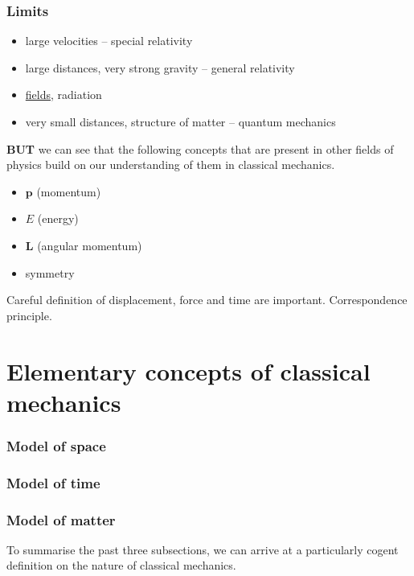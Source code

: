\documentclass{article}
\numberwithin{theorem}{section}
\numberwithin{corollary}{section}
\numberwithin{postulate}{section}
\numberwithin{lemma}{section}
\theoremstyle{definition}
\numberwithin{definition}{section}
\theoremstyle{remark}
\renewcommand{\vec}[1]{\mathbf{#1}}
\begin{document}
\subsubsection{Limits}

\begin{itemize}
  \item large velocities -- special relativity
  \item large distances, very strong gravity -- general relativity
  \item \underline{fields}, radiation
  \item very small distances, structure of matter -- quantum mechanics
\end{itemize}

\textbf{BUT} we can see that the following concepts that are present in other
fields of physics build on our understanding of them in classical mechanics.

\begin{itemize}
  \item $\vec{p}$ (momentum)
  \item $E$ (energy)
  \item $\vec{L}$ (angular momentum)
  \item symmetry
\end{itemize}

Careful definition of displacement, force and time are important. Correspondence
principle.

\section{Elementary concepts of classical mechanics}

\subsubsection{Model of space}

\subsubsection{Model of time}

\subsubsection{Model of matter}

To summarise the past three subsections, we can arrive at a particularly cogent
definition on the nature of classical mechanics.
\end{document}
